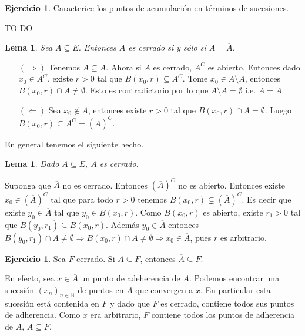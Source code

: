 \documentclass[12pt]{article}
\theoremstyle{plain}
\newtheorem{Lem}[Th]{Lema}             %
\theoremstyle{definition}
\newtheorem{Ej}[Th]{Ejercicio}
\theoremstyle{remark}
\numberwithin{equation}{section}
\newcommand{\bN}{\mathbb{N}}        %
\renewcommand{\:}{\colon}           %
\begin{document}
\begin{multicols}{2}
\begin{Ej}
  Caracterice los puntos de acumulación en términos de sucesiones.
\end{Ej}

\begin{ptcb}
TO DO
\end{ptcb}
\begin{Lem}
  Sea $A\subseteq E$. Entonces $A$ es cerrado si y sólo si $A=\overline{A}$.
\end{Lem}
\begin{ptcbp}
\begin{enumerate}
  \item[$(\Rightarrow)$] Tenemos $A\subseteq\overline{A}$. Ahora si $A$ es cerrado, $A^C$ es abierto. Entonces dado $x_0\in A^C$, existe $r>0$ tal que $B(x_0,r)\subseteq A^C$. Tome $x_0\in\overline{A}\setminus A$, entonces $B(x_0,r)\cap A\neq\emptyset$. Esto es contradictorio por lo que $\overline{A}\setminus A=\emptyset$ i.e. $A=\overline{A}$.
   \item[$(\Leftarrow)$] Sea $x_0\not\in\overline{A}$, entonces existe $r>0$ tal que $B(x_0,r)\cap A=\emptyset$. Luego $B(x_0,r)\subseteq A^C=(\overline{A})^C$.
\end{enumerate}
\end{ptcbp}

En general tenemos el siguiente hecho.

\begin{Lem}
  Dado $A\subseteq E$, $\overline{A}$ es cerrado.
\end{Lem}

\begin{ptcbp}
Suponga que $\overline{A}$  no es cerrado. Entonces $(\overline{A})^C$ no es abierto. Entonces existe $x_0\in(\overline{A})^C$ tal que para todo $r>0$ tenemos $B(x_0,r)\subsetneq (\overline{A})^C$. Es decir que existe $y_0\in \overline{A}$ tal que $y_0\in B(x_0,r)$. Como $B(x_0,r)$ es abierto, existe $r_1 > 0$ tal que $B(y_0,r_1)\subseteq B(x_0,r)$. Además $y_0\in \overline{A}$ entonces $B(y_0,r_1)\cap A\neq \emptyset\Rightarrow B(x_0,r)\cap A\neq \emptyset\Rightarrow x_0\in \overline{A}$, pues $r$ es arbitrario.

\end{ptcbp}

\begin{Ej}
  Sea $F$ cerrado. Si $A\subseteq F$, entonces $\overline{A}\subseteq F$.
\end{Ej}

\begin{ptcb}
En efecto, sea $x\in\overline{A}$ un punto de adeherencia de $A$. Podemos encontrar una sucesión $(x_n)_{n\in\bN}$ de puntos en $A$ que convergen a $x$. En particular esta sucesión está contenida en $F$ y dado que $F$ es cerrado, contiene todos sus puntos de adherencia. Como $x$ era arbitrario, $F$ contiene todos los puntos de adherencia de $A$, $\overline{A}\subseteq F$.
\end{ptcb}


\end{multicols}
\end{document}
